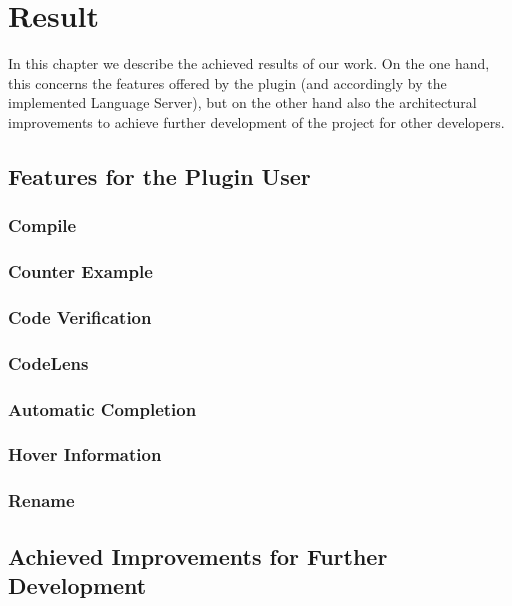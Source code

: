 \section{Result}
In this chapter we describe the achieved results of our work.
On the one hand, this concerns the features offered by the plugin
(and accordingly by the implemented Language Server),
but on the other hand also the architectural improvements to achieve further development of the project for other developers.

\subsection{Features for the Plugin User}

\subsubsection{Compile}
\subsubsection{Counter Example}
\subsubsection{Code Verification}
\subsubsection{CodeLens}
\subsubsection{Automatic Completion}
\subsubsection{Hover Information}
\subsubsection{Rename}

\subsection{Achieved Improvements for Further Development}
